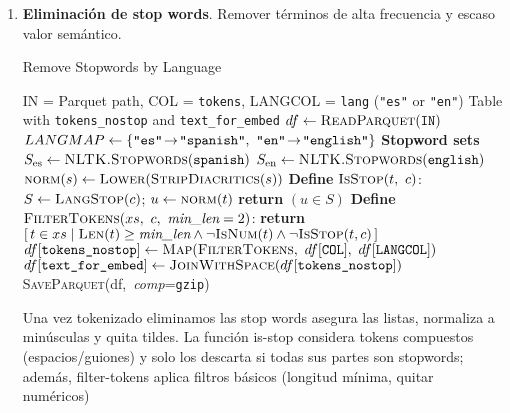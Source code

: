 \begin{enumerate}
    \item \textbf{Eliminación de stop words}. Remover términos de alta frecuencia y escaso valor semántico.

\begin{algorithmEN}[H]
  \caption{Remove Stopwords by Language}
  \begin{algorithmic}[1]
    \Require IN = Parquet path,\; COL = \texttt{tokens},\; LANGCOL = \texttt{lang} (\texttt{"es"} or \texttt{"en"})
    \Ensure Table with \texttt{tokens\_nostop} and \texttt{text\_for\_embed}
    \State $df \leftarrow \textsc{ReadParquet}(\texttt{IN})$ 
    \State $LANGMAP \Assign \{\texttt{"es"}\!\to\!\texttt{"spanish"},\ \texttt{"en"}\!\to\!\texttt{"english"}\}$
    \Statex \textbf{Stopword sets}
    \State $S_{\mathrm{es}} \leftarrow \textsc{NLTK.Stopwords}(\texttt{spanish})$
    \State $S_{\mathrm{en}} \leftarrow \textsc{NLTK.Stopwords}(\texttt{english})$
    \State $\textsc{norm}(s) \leftarrow \textsc{Lower}(\textsc{StripDiacritics}(s))$
    \State \textbf{Define} $\textsc{IsStop}(t,\ c)$:
      \Statex \quad $S \leftarrow \textsc{LangStop}(c)$;\; $u \leftarrow \textsc{norm}(t)$
      \Statex \quad \textbf{return} $(u \in S)$
    \State \textbf{Define} $\textsc{FilterTokens}(xs,\ c,\ \textit{min\_len}=2)$:
    \Statex \quad \textbf{return} $[\, t\in xs \mid \textsc{Len}(t)\ge \textit{min\_len} \land \neg\textsc{IsNum}(t) \land \neg\textsc{IsStop}(t,c)\,]$ 
    \State $df[\texttt{tokens\_nostop}] \Assign \textsc{Map}(\textsc{FilterTokens},\ df[\texttt{COL}],\ df[\texttt{LANGCOL}])$
    \State $df[\texttt{text\_for\_embed}] \leftarrow \textsc{JoinWithSpace}(df[\texttt{tokens\_nostop}])$
    \Statex \textsc{SaveParquet}(df,\ \textit{comp}=\texttt{gzip})
  \end{algorithmic}
  \label{alg:remove_stopwords_lang}
\end{algorithmEN}

Una vez tokenizado eliminamos las stop words asegura las listas, normaliza a minúsculas y quita tildes.
La función is-stop considera tokens compuestos (espacios/guiones) y solo los descarta si todas sus partes 
son stopwords; además, filter-tokens aplica filtros básicos (longitud mínima, quitar numéricos)


\end{enumerate}
